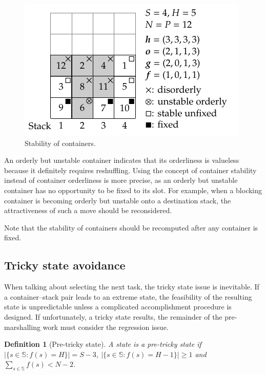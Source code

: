 \documentclass[review,3p,times,12pt,number]{elsarticle}\usepackage{amsmath}\usepackage{amssymb}
\newtheorem{definition}{Definition}
\begin{document}
\begin{figure}[htbp]
\centering
\includegraphics{figs/stable.pdf}
\caption{Stability of containers.}
\label{fig:stable}
\end{figure}

An orderly but unstable container indicates that its orderliness is valueless because it definitely requires reshuffling.
Using the concept of container stability instead of container orderliness is more precise, as an orderly but unstable container has no opportunity to be fixed to its slot.
For example, when a blocking container is becoming orderly but unstable onto a destination stack, the attractiveness of such a move should be reconsidered.






Note that the stability of containers should be recomputed after any container is fixed.


\subsection{Tricky state avoidance}
\label{sec:avoid}

When talking about selecting the next task, the tricky state issue is inevitable. If a container--stack pair leads to an extreme state, the feasibility of the resulting state is unpredictable unless a complicated accomplishment procedure is designed. If unfortunately, a tricky state results, the remainder of the pre-marshalling work must consider the regression issue.

\begin{definition}[Pre-tricky state]\label{def:pre-tricky}
A state is a pre-tricky state if $|\{s\in\mathbb{S}: f(s)=H\}|=S-3$, $|\{s\in\mathbb{S}: f(s)=H-1\}|\ge 1$ and $\sum_{s\in\mathbb{S}}f(s)<N-2$.
\end{definition}
\end{document}
